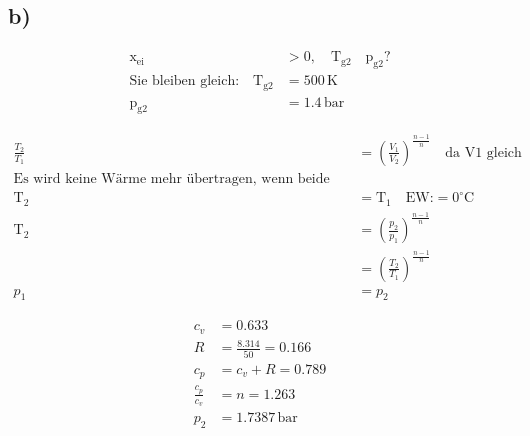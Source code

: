 

\subsection*{b)}

\begin{align*}
\text{x}_{\text{ei}} &> 0, \quad \text{T}_{\text{g2}} \quad \text{p}_{\text{g2}}? \\
\text{Sie bleiben gleich:} \quad \text{T}_{\text{g2}} &= 500 \, \text{K} \\
\text{p}_{\text{g2}} &= 1.4 \, \text{bar}
\end{align*}

\begin{align*}
\frac{T_2}{T_1} &= \left( \frac{V_1}{V_2} \right)^{\frac{n-1}{n}} \quad \text{da V1 gleich} \\
\text{Es wird keine Wärme mehr übertragen, wenn beide Temperaturen gleich sind} \\
\text{T}_2 &= \text{T}_1 \quad \text{EW:} = 0^\circ \text{C} \\
\text{T}_2 &= \left( \frac{p_2}{p_1} \right)^{\frac{n-1}{n}} \\
&= \left( \frac{T_2}{T_1} \right)^{\frac{n-1}{n}} \\
p_1 &= p_2
\end{align*}

\begin{align*}
c_v &= 0.633 \\
R &= \frac{8.314}{50} = 0.166 \\
c_p &= c_v + R = 0.789 \\
\frac{c_p}{c_v} &= n = 1.263 \\
p_2 &= 1.7387 \, \text{bar}
\end{align*}